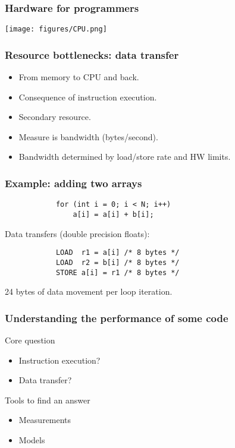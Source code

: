 \documentclass[dvipsnames,presentation,aspectratio=169,14pt]{beamer}
\begin{document}
\begin{frame}
  \frametitle{Hardware for programmers}
  \begin{center}
    \texttt{[image: figures/CPU.png]}
  \end{center}
\end{frame}

\begin{frame}[fragile]
  \frametitle{Resource bottlenecks: data transfer}
  \begin{itemize}[itemsep=8pt]
  \item From memory to CPU and back.
  \item Consequence of instruction execution.
  \item Secondary resource.
  \item Measure is bandwidth (bytes/second).
  \item Bandwidth determined by load/store rate and HW limits.
  \end{itemize}

\end{frame}

\begin{frame}[fragile]
  \frametitle{Example: adding two arrays}
\begin{verbatim}
            for (int i = 0; i < N; i++)
                a[i] = a[i] + b[i];
\end{verbatim}

  \vskip 11pt
  Data transfers (double precision floats):
  \vskip 15pt

\begin{verbatim}
            LOAD  r1 = a[i] /* 8 bytes */
            LOAD  r2 = b[i] /* 8 bytes */
            STORE a[i] = r1 /* 8 bytes */
\end{verbatim}

  \vskip 15pt

  24 bytes of data movement per loop iteration.
\end{frame}

\begin{frame}
  \frametitle{Understanding the performance of some code}

  \begin{challenge}{Core question}
    \begin{center}
    \end{center}
    \begin{itemize}[itemsep=5pt]
    \item Instruction execution?
    \item Data transfer?
    \end{itemize}
  \end{challenge}
  \pause
  \begin{answer}{Tools to find an answer}
    \begin{itemize}[itemsep=5pt]
    \item Measurements
    \item Models
    \end{itemize}
  \end{answer}
\end{frame}
\end{document}
